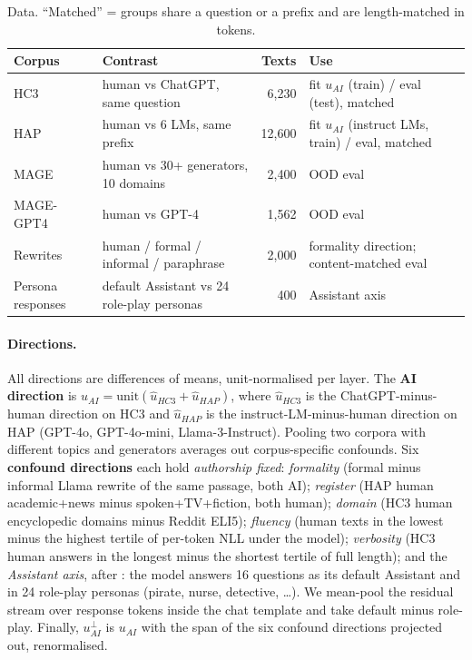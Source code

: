 \begin{table}[t]
\centering\small
\caption{Data. ``Matched'' = groups share a question or a prefix and are length-matched in tokens.}
\label{tab:data}
\begin{tabular}{llrl}
\toprule
Corpus & Contrast & Texts & Use\\
\midrule
HC3 & human vs ChatGPT, same question & 6{,}230 & fit $u_{AI}$ (train) / eval (test), matched\\
HAP & human vs 6 LMs, same prefix & 12{,}600 & fit $u_{AI}$ (instruct LMs, train) / eval, matched\\
MAGE & human vs 30+ generators, 10 domains & 2{,}400 & OOD eval\\
MAGE-GPT4 & human vs GPT-4 & 1{,}562 & OOD eval\\
Rewrites & human / formal / informal / paraphrase & 2{,}000 & formality direction; content-matched eval\\
Persona responses & default Assistant vs 24 role-play personas & 400 & Assistant axis\\
\bottomrule
\end{tabular}
\end{table}

\paragraph{Directions.} All directions are differences of means, unit-normalised per layer. The \textbf{AI direction} is $u_{AI} = \mathrm{unit}(\hat u_{HC3} + \hat u_{HAP})$, where $\hat u_{HC3}$ is the ChatGPT-minus-human direction on HC3 and $\hat u_{HAP}$ is the instruct-LM-minus-human direction on HAP (GPT-4o, GPT-4o-mini, Llama-3-Instruct). Pooling two corpora with different topics and generators averages out corpus-specific confounds. Six \textbf{confound directions} each hold \emph{authorship fixed}:
\textit{formality} (formal minus informal Llama rewrite of the same passage, both AI);
\textit{register} (HAP human academic+news minus spoken+TV+fiction, both human);
\textit{domain} (HC3 human encyclopedic domains minus Reddit ELI5);
\textit{fluency} (human texts in the lowest minus the highest tertile of per-token NLL under the model);
\textit{verbosity} (HC3 human answers in the longest minus the shortest tertile of full length);
and the \textit{Assistant axis}, after \citet{lu2026assistant}: the model answers 16 questions as its default Assistant and in 24 role-play personas (pirate, nurse, detective, \dots). We mean-pool the residual stream over response tokens inside the chat template and take default minus role-play. Finally, $u_{AI}^{\perp}$ is $u_{AI}$ with the span of the six confound directions projected out, renormalised.

